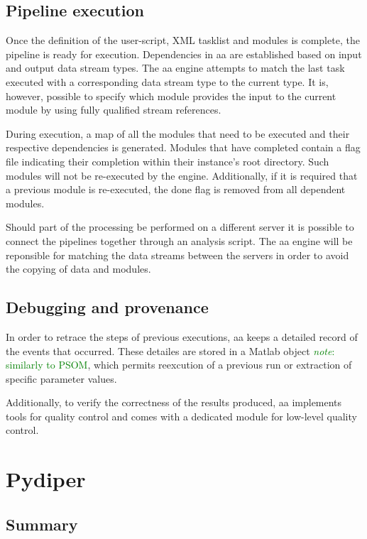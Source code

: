 \documentclass{report}
\newcommand{\note}[1]{\textcolor{green}{\textit{note}: #1}}
\begin{document}
        \subsection{Pipeline execution}
        Once the definition of the user-script, XML tasklist and modules is
complete, the pipeline is ready for execution. Dependencies in aa are
established based on input and output data stream types. The aa engine attempts
to match the last task executed with a corresponding data stream type to the
current type. It is, however, possible to specify which module provides the
input to the current module by using fully qualified stream references.

        During execution, a map of all the modules that need to be executed and
their respective dependencies is generated. Modules that have completed contain
a flag file indicating their completion within their instance's root directory. Such
modules will not be re-executed by the engine.
Additionally, if it is required that a previous module is re-executed, the done flag is
removed from all dependent modules.  

        Should part of the processing be performed on a different server it is
possible to connect the pipelines together through an analysis script. The aa engine will be reponsible for
matching the data streams between the servers in order to avoid the copying of
data and modules.

        \subsection{Debugging and provenance}
        In order to retrace the steps of previous executions, aa keeps a
detailed record of the events that occurred. These detailes are stored in a
Matlab object \note{similarly to PSOM}, which permits reexcution of a previous
run or extraction of specific parameter values.

        Additionally, to verify the correctness of the results produced, aa
implements tools for quality control and comes with a dedicated module for
low-level quality control.
    

          
    \section{Pydiper}
        \subsection{Summary}
\end{document}
